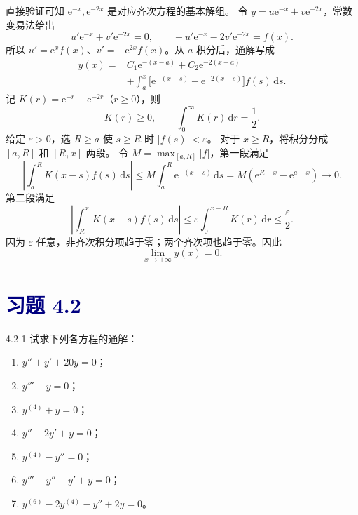 \documentclass[UTF8,a4paper,11pt]{ctexart}
\newcommand{\dd}{\,\mathrm d}
\newcommand{\e}{\mathrm e}
\newcommand{\sect}[1]{\section*{\textcolor{navy}{习题 #1}}}
\begin{document}
\begin{solution}
直接验证可知 $\e^{-x},\e^{-2x}$ 是对应齐次方程的基本解组。
令 $y=u\e^{-x}+v\e^{-2x}$，常数变易法给出
\[
u'\e^{-x}+v'\e^{-2x}=0,\qquad
-u'\e^{-x}-2v'\e^{-2x}=f(x).
\]
所以 $u'=\e^xf(x)$、$v'=-\e^{2x}f(x)$。从 $a$ 积分后，通解写成
\[
\begin{aligned}
y(x)={}&C_1\e^{-(x-a)}+C_2\e^{-2(x-a)}\\
&+\int_a^x\bigl[\e^{-(x-s)}-\e^{-2(x-s)}\bigr]f(s)\dd s.
\end{aligned}
\]
记 $K(r)=\e^{-r}-\e^{-2r}$（$r\ge0$），则
\[
K(r)\ge0,\qquad \int_0^{\infty}K(r)\dd r=\frac12.
\]
给定 $\varepsilon>0$，选 $R\ge a$ 使 $s\ge R$ 时 $|f(s)|<\varepsilon$。
对于 $x\ge R$，将积分分成 $[a,R]$ 和 $[R,x]$ 两段。
令 $M=\max_{[a,R]}|f|$，第一段满足
\[
\left|\int_a^RK(x-s)f(s)\dd s\right|
\le M\int_a^R\e^{-(x-s)}\dd s
=M(\e^{R-x}-\e^{a-x})\longrightarrow0.
\]
第二段满足
\[
\left|\int_R^xK(x-s)f(s)\dd s\right|
\le\varepsilon\int_0^{x-R}K(r)\dd r\le\frac\varepsilon2.
\]
因为 $\varepsilon$ 任意，非齐次积分项趋于零；两个齐次项也趋于零。因此
\[
\boxed{\lim_{x\to+\infty}y(x)=0.}
\]
\end{solution}

\sect{4.2}
\begin{problem}{4.2-1}
试求下列各方程的通解：
  \begin{enumerate}[label=(\arabic*)]
    \item $y''+y'+20y=0$；
    \item $y'''-y=0$；
    \item $y^{(4)}+y=0$；
    \item $y''-2y'+y=0$；
    \item $y^{(4)}-y''=0$；
    \item $y'''-y''-y'+y=0$；
    \item $y^{(6)}-2y^{(4)}-y''+2y=0$。
  \end{enumerate}
\end{problem}
\end{document}

